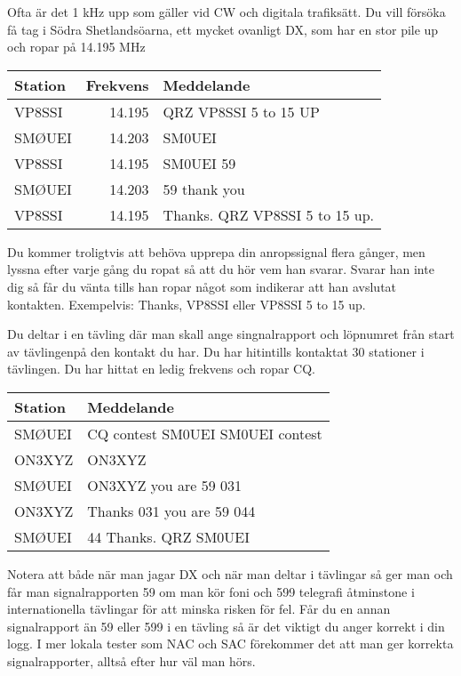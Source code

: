 Ofta är det 1 kHz upp som gäller vid CW och digitala trafiksätt.  Du vill
försöka få tag i Södra Shetlandsöarna, ett mycket ovanligt DX, som har en stor
pile up och ropar på 14.195 MHz

\begin{tabular}{lrl}
	Station & Frekvens & Meddelande                     \\ \hline
	VP8SSI  &   14.195 & QRZ VP8SSI  5 to 15 UP         \\
	SMØUEI  &   14.203 & SM0UEI                         \\
	VP8SSI  &   14.195 & SM0UEI 59                      \\
	SMØUEI  &   14.203 & 59 thank you                   \\
	VP8SSI  &   14.195 & Thanks. QRZ VP8SSI 5 to 15 up.
\end{tabular}

Du kommer troligtvis att behöva upprepa din anropssignal flera gånger, men
lyssna efter varje gång du ropat så att du hör vem han svarar. Svarar han inte
dig så får du vänta tills han ropar något som indikerar att han avslutat
kontakten. Exempelvis: Thanks, VP8SSI eller VP8SSI 5 to 15 up.

Du deltar i en tävling där man skall ange singnalrapport och löpnumret från
start av tävlingenpå den kontakt du har. Du har hitintills kontaktat 30
stationer i tävlingen. Du har hittat en ledig frekvens och ropar CQ.

\begin{tabular}{ll}
	Station & Meddelande                       \\ \hline
	SMØUEI  & CQ contest SM0UEI SM0UEI contest \\
	ON3XYZ  & ON3XYZ                           \\
	SMØUEI  & ON3XYZ you are 59 031            \\
	ON3XYZ  & Thanks 031 you are 59 044        \\
	SMØUEI  & 44 Thanks. QRZ SM0UEI
\end{tabular}

Notera att både när man jagar DX och när man deltar i tävlingar så ger man och
får man signalrapporten 59 om man kör foni och 599 telegrafi åtminstone i
internationella tävlingar för att minska risken för fel. Får du en annan
signalrapport än 59 eller 599 i en tävling så är det viktigt du anger korrekt i
din logg. I mer lokala tester som NAC och SAC förekommer det att man ger
korrekta signalrapporter, alltså efter hur väl man hörs.

